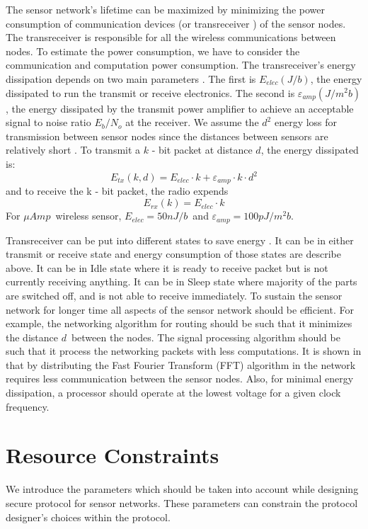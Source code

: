 	The sensor network's lifetime can be maximized by minimizing the power consumption of communication devices (or transreceiver ) of the sensor nodes.
	The transreceiver is responsible for all the wireless communications between nodes.
	To estimate the power consumption, we have to consider the communication and computation power consumption.
	The transreceiver's energy dissipation depends on two main parameters \cite{wang2002energy}.
	The first is $E_{elec} (J/b)$, the energy dissipated to run the transmit or receive electronics.
	The second is $\varepsilon_{amp} (J/m^2 b)$, the energy dissipated by the transmit power amplifier to achieve an acceptable signal to noise ratio $E_{b} / N_{o} $ at the receiver.
	We assume the $d^2$ energy loss for transmission between sensor nodes since the distances between sensors are relatively short \cite{ettus1998system}. 
	To transmit a $k$ - bit packet at distance $d$, the energy dissipated is:
	\begin{equation}
		E_{tx}(k, d) = E_{elec} \cdot k + \varepsilon_{amp} \cdot k \cdot d^{2}
	\end{equation}
	and to receive the k - bit packet, the radio expends
	\begin{equation}
		E_{rx}(k) = E_{elec} \cdot k
	\end{equation}
	For $\mu Amp$\ wireless sensor, $E_{elec} = 50nJ/b$\ and $\varepsilon_{amp} = 100pJ/m^2 b$.

	Transreceiver can be put into different states to save energy \cite{karl2007protocols}.
	It can be in either transmit or receive state and energy consumption of those states are describe above.
	It can be in Idle state where it is ready to receive packet but is not currently receiving anything.
	It can be in Sleep state where majority of the parts are switched off, and is not able to receive immediately. 
 	To sustain the sensor network for longer time all aspects of the sensor network should be efficient.
	For example, the networking algorithm for routing should be such that it minimizes the distance $d$\ between the nodes.
	The signal processing algorithm should be such that it process the networking packets with less computations.
	It is shown in \cite{wang2002energy} that by distributing the Fast Fourier Transform (FFT) algorithm in the network requires less communication between the sensor nodes.
	Also, for minimal energy dissipation, a processor should operate at the lowest voltage for a given clock frequency.

\section{Resource Constraints}
	\label{sec:aggregate-adversary}
	We introduce the parameters which should be taken into account while designing secure protocol for sensor networks.  
	These parameters can constrain the protocol designer's choices within the protocol.

